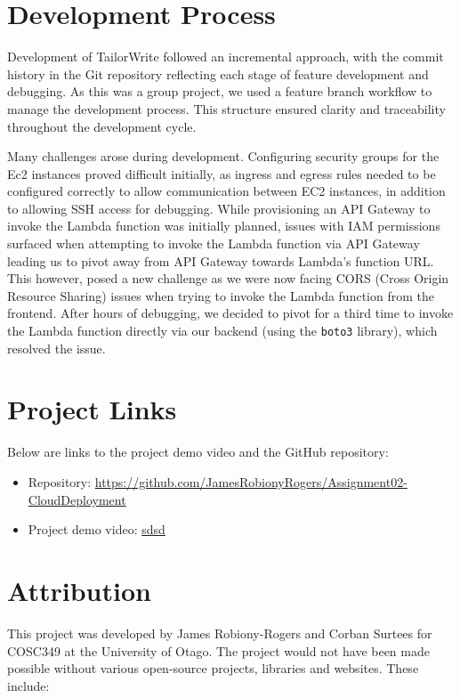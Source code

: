 \documentclass[a4paper, 11pt]{article}
\newcommand{\projectRepoURL}{https://github.com/JamesRobionyRogers/Assignment02-CloudDeployment}
\newcommand{\projectDemoVideoURL}{sdsd}
\newcommand{\estimatedCostInUseURL}{https://calculator.aws/\#/estimate?id=33078729fb24a4066ea8e14f12bfd1392267dc69}
\begin{document}

\section{Development Process}

Development of TailorWrite followed an incremental approach, with the commit history in the Git repository reflecting each stage of feature development and debugging. As this was a group project, we used a feature branch workflow to manage the development process. This structure ensured clarity and traceability throughout the development cycle.

Many challenges arose during development. Configuring security groups for the Ec2 instances proved difficult initially, as ingress and egress rules needed to be configured correctly to allow communication between EC2 instances, in addition to allowing SSH access for debugging. While provisioning an API Gateway to invoke the Lambda function was initially planned, issues with IAM permissions surfaced when attempting to invoke the Lambda function via API Gateway leading us to pivot away from API Gateway towards Lambda's function URL. This however, posed a new challenge as we were now facing CORS (Cross Origin Resource Sharing) issues when trying to invoke the Lambda function from the frontend. After hours of debugging, we decided to pivot for a third time to invoke the Lambda function directly via our backend (using the \texttt{boto3} library), which resolved the issue.

\section{Project Links}
Below are links to the project demo video and the GitHub repository:

\begin{itemize}
    \item Repository: \url{\projectRepoURL}
    \item Project demo video: \url{\projectDemoVideoURL}
\end{itemize}

\section{Attribution}
This project was developed by James Robiony-Rogers and Corban Surtees for COSC349 at the University of Otago. The project would not have been made possible without various open-source projects, libraries and websites. These include: 
\end{document}
